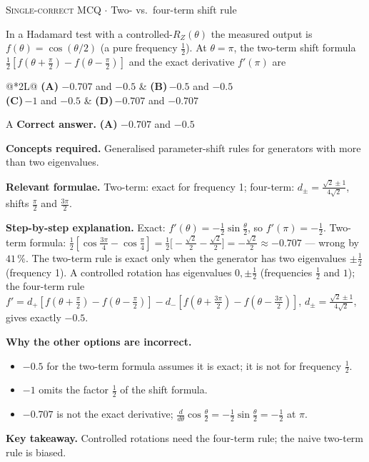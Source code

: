 \documentclass[11pt,a4paper]{article}
\newcommand{\optlabel}[1]{\textbf{(#1)}}
\newcommand{\correctlabel}[1]{\textcolor{okgreen}{\textbf{(#1)}\,\ding{51}}}
\newenvironment{qitem}[1]{\begin{list}{}{\setlength{\leftmargin}{3.3em}\setlength{\labelwidth}{3.1em}%
  \setlength{\labelsep}{0.2em}\setlength{\topsep}{3pt}\setlength{\parsep}{3pt}}\item[\textbf{Q.#1}\hfill]}{\end{list}}
\newcommand{\qsep}{\par\vspace{2pt}{\color{black!15}\hrule}\vspace{4pt}}
\newcommand{\qmeta}[2]{{\footnotesize\color{black!60}\textsc{#1} \;$\cdot$\; #2}\par}
\begin{document}
\begin{qitem}{63}
\qmeta{Single-correct MCQ}{Two- vs.\ four-term shift rule}
In a Hadamard test with a controlled-$R_Z(\theta)$ the measured output is $f(\theta) = \cos(\theta/2)$ (a pure frequency
$\frac12$). At $\theta = \pi$, the two-term shift formula $\frac12[f(\theta + \frac\pi2) - f(\theta - \frac\pi2)]$ and the exact derivative $f'(\pi)$ are
\par\smallskip\noindent\begin{tabularx}{\linewidth}{@{}*{2}{L}@{}}
\correctlabel{A}\,$-0.707$ and $-0.5$ & \optlabel{B}\,$-0.5$ and $-0.5$ \\[3pt]
\optlabel{C}\,$-1$ and $-0.5$ & \optlabel{D}\,$-0.707$ and $-0.707$
\end{tabularx}
\end{qitem}
\begin{solbox}{A}
\textbf{\color{brand}Correct answer.} \textcolor{okgreen}{\textbf{(A)}} $-0.707$ and $-0.5$

\textbf{\color{brand}Concepts required.} Generalised parameter-shift rules for generators with more than two eigenvalues.

\textbf{\color{brand}Relevant formulae.} Two-term: exact for frequency 1; four-term: $d_\pm = \frac{\sqrt2 \pm 1}{4\sqrt2}$, shifts $\frac\pi2$ and $\frac{3\pi}2$.

\textbf{\color{brand}Step-by-step explanation.} Exact: $f'(\theta) = -\frac12\sin\frac\theta2$, so $f'(\pi) = -\frac12$.
Two-term formula: $\frac12[\cos\frac{3\pi}{4} - \cos\frac\pi4] = \frac12\big[-\frac{\sqrt2}{2} - \frac{\sqrt2}{2}\big] = -\frac{\sqrt2}{2} \approx -0.707$ --- wrong
by $41\,\%$. The two-term rule is exact only when the generator has two eigenvalues $\pm\frac12$ (frequency 1). A controlled rotation has
eigenvalues $0, \pm\frac12$ (frequencies $\frac12$ and $1$); the four-term rule
$f' = d_+[f(\theta + \frac\pi2) - f(\theta - \frac\pi2)] - d_-[f(\theta + \frac{3\pi}2) - f(\theta - \frac{3\pi}2)]$, $d_\pm = \frac{\sqrt2 \pm 1}{4\sqrt2}$,
gives exactly $-0.5$.

\textbf{\color{brand}Why the other options are incorrect.}
\begin{itemize}[leftmargin=2.4em, itemsep=1pt, topsep=2pt]
\item[\textbf{(B)}] $-0.5$ for the two-term formula assumes it is exact; it is not for frequency $\frac12$.
\item[\textbf{(C)}] $-1$ omits the factor $\frac12$ of the shift formula.
\item[\textbf{(D)}] $-0.707$ is not the exact derivative; $\frac{d}{d\theta}\cos\frac\theta2 = -\frac12\sin\frac\theta2 = -\frac12$ at $\pi$.
\end{itemize}
\textbf{\color{brand}Key takeaway.} Controlled rotations need the four-term rule; the naive two-term rule is biased.
\end{solbox}
\qsep
\end{document}
